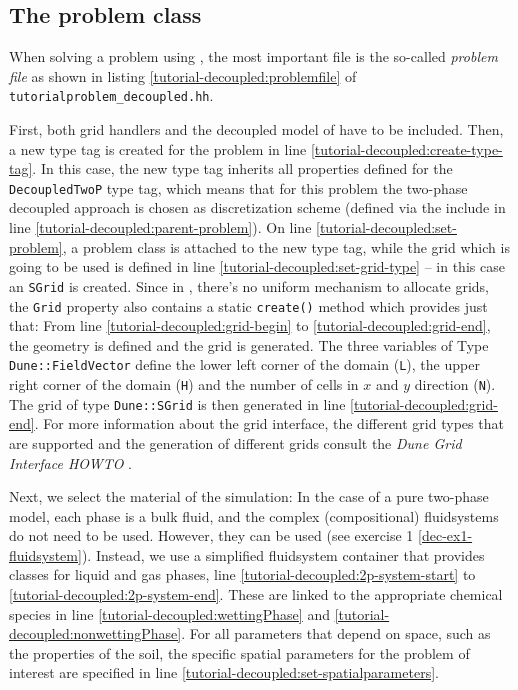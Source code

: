 \subsection{The problem class} \label{decoupled_problem}

When solving a problem using \Dumux, the most important file is the
so-called \textit{problem file} as shown in listing
\ref{tutorial-decoupled:problemfile} of
\texttt{tutorialproblem\_decoupled.hh}.

\begin{lst}\label{tutorial-decoupled:problemfile} \mbox{}

\end{lst}

First, both \Dune  grid handlers and the decoupled model of \Dumux 
have to be included. Then, a new type tag is created for the problem 
in line \ref{tutorial-decoupled:create-type-tag}.  In this case, the 
new type tag inherits all properties defined for the \texttt{DecoupledTwoP} 
type tag, which means that for this problem the two-phase decoupled approach
is chosen as discretization scheme (defined via the include in line 
\ref{tutorial-decoupled:parent-problem}). On line \ref{tutorial-decoupled:set-problem}, 
a problem class is attached to the new type tag, while the grid which
is going to be used is defined in line \ref{tutorial-decoupled:set-grid-type} --
in this case an \texttt{SGrid} is created.  Since in \Dune, there's no uniform
mechanism to allocate grids, the \texttt{Grid} property also contains
a static \texttt{create()} method which provides just that: From line 
\ref{tutorial-decoupled:grid-begin} to \ref{tutorial-decoupled:grid-end}, 
the geometry is defined and the grid is generated. The three variables of 
Type \texttt{Dune::FieldVector} define the lower left corner of the domain 
(\texttt{L}), the upper right corner of the domain (\texttt{H}) and the number 
of cells in $x$ and $y$ direction (\texttt{N}). The grid of type 
\texttt{Dune::SGrid} is then generated in line \ref{tutorial-decoupled:grid-end}. 
For more information about the \Dune grid interface, the different grid types 
that are supported and the generation of different grids consult 
the \textit{Dune Grid Interface HOWTO} \cite{DUNE-HP}. 

Next, we select the material of the simulation: In the case of a pure two-phase
model, each phase is a bulk fluid, and the complex (compositional) fluidsystems
do not need to be used. However, they can be used (see exercise 1 \ref{dec-ex1-fluidsystem}). 
Instead, we use a simplified fluidsystem container that provides classes 
for liquid and gas phases, line \ref{tutorial-decoupled:2p-system-start} to 
\ref{tutorial-decoupled:2p-system-end}. These are linked to the appropriate 
chemical species in line \ref{tutorial-decoupled:wettingPhase} and 
\ref{tutorial-decoupled:nonwettingPhase}. For all parameters that depend 
on space, such as the properties of the soil, the specific spatial parameters 
for the problem of interest are specified in line
\ref{tutorial-decoupled:set-spatialparameters}. 

